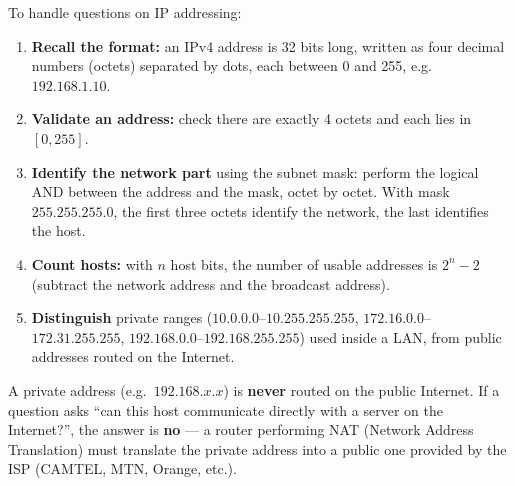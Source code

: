 \documentclass[11pt]{article}
\newcommand{\cle}[1]{{\popxbold\color{popdark}#1}}
\begin{document}
\begin{methode}
To handle questions on IP addressing:
\begin{enumerate}
\item \textbf{Recall the format:} an \cle{IPv4 address} is 32 bits long, written as four decimal numbers (octets) separated by dots, each between 0 and 255, e.g.\ $192.168.1.10$.
\item \textbf{Validate an address:} check there are exactly 4 octets and each lies in $[0, 255]$.
\item \textbf{Identify the network part} using the subnet mask: perform the logical AND between the address and the mask, octet by octet. With mask $255.255.255.0$, the first three octets identify the network, the last identifies the host.
\item \textbf{Count hosts:} with $n$ host bits, the number of usable addresses is $2^n - 2$ (subtract the network address and the broadcast address).
\item \textbf{Distinguish} private ranges ($10.0.0.0$--$10.255.255.255$, $172.16.0.0$--$172.31.255.255$, $192.168.0.0$--$192.168.255.255$) used inside a LAN, from public addresses routed on the Internet.
\end{enumerate}
\end{methode}

\begin{attention}
A private address (e.g.\ $192.168.x.x$) is \textbf{never} routed on the public Internet. If a question asks ``can this host communicate directly with a server on the Internet?'', the answer is \textbf{no} — a router performing \cle{NAT} (Network Address Translation) must translate the private address into a public one provided by the ISP (CAMTEL, MTN, Orange, etc.).
\end{attention}
\end{document}
